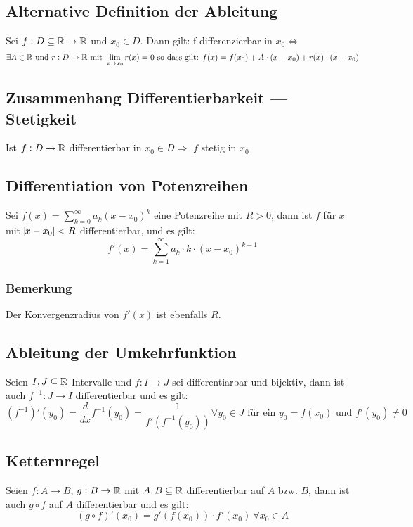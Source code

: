 \subsection{Alternative Definition der Ableitung}
Sei $f: D \subseteq \mathbb{R} \rightarrow \mathbb{R}$ und $x_0 \in D$. Dann gilt:
f differenzierbar in $x_0 \Leftrightarrow$
\begin{equation*}
    \exists A \in \mathbb{R} \text{ und } r: D \rightarrow \mathbb{R} \text{ mit }
    \lim_{x \rightarrow x_0} r(x) = 0 \text{ so dass gilt: }
    f(x) = f(x_0) + A \cdot (x - x_0)  + r(x) \cdot (x-x_0)
\end{equation*}

\subsection{Zusammenhang Differentierbarkeit --- Stetigkeit}
Ist $f: D \rightarrow \mathbb{R}$ differentierbar in $x_0 \in D \Rightarrow$
$f$ stetig in $x_0$

\subsection{Differentiation von Potenzreihen}
Sei $f(x) = \sum_{k=0}^\infty a_k {(x-x_0)}^k$ eine Potenzreihe mit $R>0$, dann
ist $f$ für $x$ mit $\abs{x-x_0}<R$ differentierbar, und es gilt:
\begin{equation*}
    f'(x) = \sum_{k=1}^\infty a_k \cdot k \cdot {(x - x_0)}^{k-1}
\end{equation*}

\subsubsection{Bemerkung}
Der Konvergenzradius von $f'(x)$ ist ebenfalls $R$.

\subsection{Ableitung der Umkehrfunktion}
Seien $I, J \subseteq \mathbb{R}$ Intervalle und $f: I \rightarrow J$ sei differentiarbar
und bijektiv, dann ist auch $f^{-1}: J \rightarrow I$ differentierbar und es
gilt:
\begin{equation*}
    {(f^{-1})}'(y_0) = \frac{d}{dx} f^{-1}(y_0) =
    \frac{1}{f'(f^{-1}(y_0))} \forall y_0 \in J \text{ für ein } y_0=f(x_0)
    \text{ und } f'(y_0) \neq 0
\end{equation*}

\subsection{Ketternregel}
Seien $f: A \rightarrow B$, $g: B \rightarrow \mathbb{R}$ mit $A,B \subseteq \mathbb{R}$
differentierbar auf $A$ bzw. $B$, dann ist auch $g \circ f$ auf $A$
differentierbar und es gilt:
\begin{equation*}
    (g \circ f)'(x_0) = g'(f(x_0)) \cdot f'(x_0)\ \forall x_0 \in A
\end{equation*}

